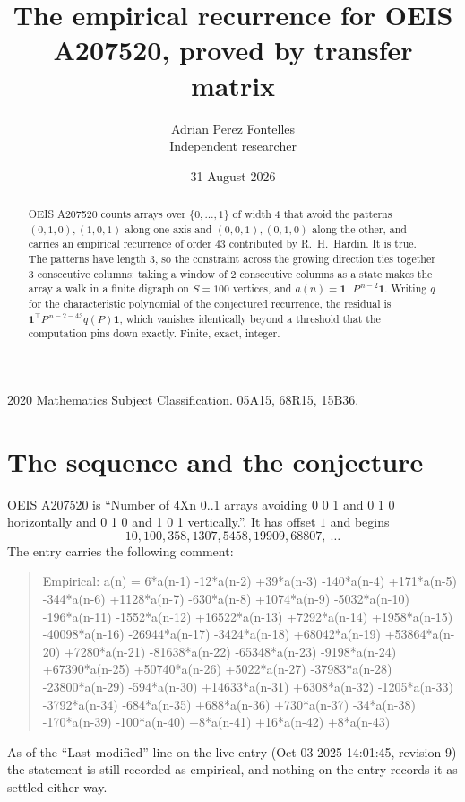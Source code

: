 \documentclass[11pt,a4paper]{article}
\title{The empirical recurrence for OEIS A207520, proved by transfer matrix}
\author{Adrian Perez Fontelles\\ \small Independent researcher}
\date{31 August 2026}
\theoremstyle{plain}
\theoremstyle{definition}
\begin{document}
\maketitle

\begin{abstract}
OEIS A207520 counts arrays over $\{0,\dots,1\}$ of width $4$ that avoid the patterns
$(0,1,0), (1,0,1)$ along one axis and $(0,0,1), (0,1,0)$ along the other, and carries an empirical recurrence of
order $43$ contributed by R.~H.~Hardin. It is true. The patterns have length $3$, so
the constraint across the growing direction ties together $3$ consecutive columns: taking a
window of $2$ consecutive columns as a state makes the array a walk in a finite digraph
on $S=100$ vertices, and $a(n)=\mathbf{1}^{\!\top}P^{\,n-2}\mathbf{1}$. Writing $q$
for the characteristic polynomial of the conjectured recurrence, the residual is
$\mathbf{1}^{\!\top}P^{\,n-2-43}q(P)\mathbf{1}$, which vanishes identically
beyond a threshold that the computation pins down exactly. Finite, exact, integer.
\end{abstract}

\noindent\small 2020 Mathematics Subject Classification. 05A15, 68R15, 15B36.\normalsize

\section{The sequence and the conjecture}

OEIS A207520 is ``Number of 4Xn 0..1 arrays avoiding 0 0 1 and 0 1 0 horizontally and 0 1 0 and 1 0 1 vertically.''. It has offset
$1$ and begins
\[
10, 100, 358, 1307, 5458, 19909, 68807,\ \dots
\]
The entry carries the following comment:
\begin{quote}\small
Empirical: a(n) = 6*a(n-1) -12*a(n-2) +39*a(n-3) -140*a(n-4) +171*a(n-5) -344*a(n-6) +1128*a(n-7) -630*a(n-8) +1074*a(n-9) -5032*a(n-10) -196*a(n-11) -1552*a(n-12) +16522*a(n-13) +7292*a(n-14) +1958*a(n-15) -40098*a(n-16) -26944*a(n-17) -3424*a(n-18) +68042*a(n-19) +53864*a(n-20) +7280*a(n-21) -81638*a(n-22) -65348*a(n-23) -9198*a(n-24) +67390*a(n-25) +50740*a(n-26) +5022*a(n-27) -37983*a(n-28) -23800*a(n-29) -594*a(n-30) +14633*a(n-31) +6308*a(n-32) -1205*a(n-33) -3792*a(n-34) -684*a(n-35) +688*a(n-36) +730*a(n-37) -34*a(n-38) -170*a(n-39) -100*a(n-40) +8*a(n-41) +16*a(n-42) +8*a(n-43)
\end{quote}
As of the ``Last modified'' line on the live entry (Oct 03 2025 14:01:45, revision
9) the statement is still recorded as empirical, and nothing on the entry
records it as settled either way.
\end{document}

